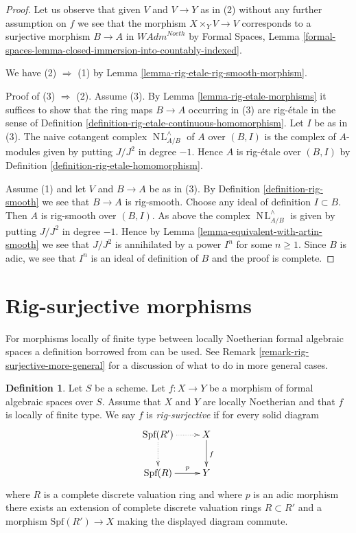 \documentclass{stacks-project}
\theoremstyle{plain}
\theoremstyle{definition}
\newtheorem{definition}[subsection]{Definition}
\theoremstyle{remark}
\numberwithin{equation}{subsection}
\def\NL{\mathop{N\!L}\nolimits}
\begin{document}
\begin{proof}
Let us observe that given $V$ and $V \to Y$ as in (2) without any
further assumption on $f$ we see that the morphism $X \times_Y V \to V$
corresponds to a surjective morphism $B \to A$ in $\textit{WAdm}^{Noeth}$
by Formal Spaces, Lemma
\ref{formal-spaces-lemma-closed-immersion-into-countably-indexed}.

\medskip\noindent
We have (2) $\Rightarrow$ (1) by
Lemma \ref{lemma-rig-etale-rig-smooth-morphism}.

\medskip\noindent
Proof of (3) $\Rightarrow$ (2). Assume (3). By
Lemma \ref{lemma-rig-etale-morphisms}
it suffices to show that the ring maps
$B \to A$ occurring in (3) are rig-\'etale in the
sense of Definition \ref{definition-rig-etale-continuous-homomorphism}.
Let $I$ be as in (3). The naive cotangent complex
$\NL_{A/B}^\wedge$ of $A$ over $(B, I)$ is the complex of $A$-modules
given by putting $J/J^2$ in degree $-1$. Hence $A$ is
rig-\'etale over $(B, I)$ by
Definition \ref{definition-rig-etale-homomorphism}.

\medskip\noindent
Assume (1) and let $V$ and $B \to A$ be as in (3).
By Definition \ref{definition-rig-smooth} we see that
$B \to A$ is rig-smooth. Choose any ideal of definition $I \subset B$.
Then $A$ is rig-smooth over $(B, I)$.
As above the complex $\NL_{A/B}^\wedge$ is 
given by putting $J/J^2$ in degree $-1$.
Hence by Lemma \ref{lemma-equivalent-with-artin-smooth}
we see that $J/J^2$ is annihilated by
a power $I^n$ for some $n \geq 1$. Since $B$ is adic, we see
that $I^n$ is an ideal of definition of $B$ and the
proof is complete.
\end{proof}














\section{Rig-surjective morphisms}
\label{section-rig-surjective}

\noindent
For morphisms locally of finite type between locally Noetherian formal
algebraic spaces a definition borrowed from \cite{ArtinII} can be used. See
Remark \ref{remark-rig-surjective-more-general} for a discussion
of what to do in more general cases.

\begin{definition}
\label{definition-rig-surjective}
Let $S$ be a scheme. Let $f : X \to Y$ be a morphism of formal
algebraic spaces over $S$. Assume that $X$ and $Y$ are locally
Noetherian and that $f$ is locally of finite type. We say
$f$ is {\it rig-surjective} if for every solid diagram
$$
\xymatrix{
\text{Spf}(R') \ar@{..>}[r] \ar@{..>}[d] & X \ar[d]^f \\
\text{Spf}(R) \ar[r]^-p & Y
}
$$
where $R$ is a complete discrete valuation ring and where
$p$ is an adic morphism there exists an
extension of complete discrete valuation rings $R \subset R'$
and a morphism $\text{Spf}(R') \to X$ making the displayed diagram commute.
\end{definition}
\end{document}
